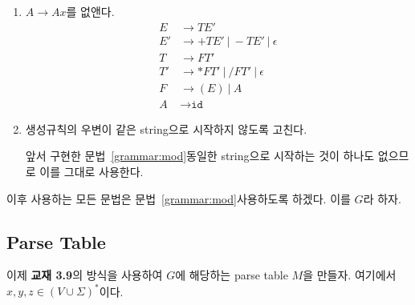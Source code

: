 \documentclass[a4paper,10pt]{scrartcl}
\numberwithin{equation}{section}
\numberwithin{figure}{section}
\numberwithin{table}{section}
\theoremstyle{definition}
\begin{document}
\begin{enumerate}
  \item $A \to Ax$를 없앤다.
        \begin{equation}\label{grammar:mod}
          \begin{aligned}
            E  & \to TE'                        \\
            E' & \to +TE'\ |\ -TE'\ |\ \epsilon \\
            T  & \to FT'                        \\
            T' & \to *FT'\ |\ /FT'\ |\ \epsilon \\
            F  & \to (E)\ |\ A                  \\
            A  & \to \texttt{id}
          \end{aligned}
        \end{equation}
  \item 생성규칙의 우변이 같은 string으로 시작하지 않도록 고친다.

        앞서 구현한 문법~\ref{grammar:mod}\은 동일한 string으로 시작하는 것이 하나도 없으므로 이를 그대로 사용한다.
\end{enumerate}

이후 사용하는 모든 문법은 문법~\ref{grammar:mod}\을 사용하도록 하겠다. 이를 $G$라 하자.

\subsection{Parse Table}
\label{subsec:parsetable}

이제 \textbf{교재 3.9}의 방식을 사용하여 $G$에 해당하는 parse table $M$을 만들자. 여기에서 $x, y, z \in (V \cup \Sigma)^*$이다.
\end{document}
